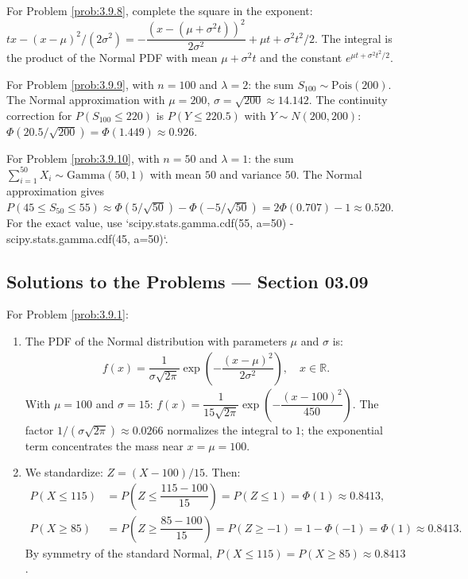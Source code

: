 \begin{sugerencia}
	\label{sug:3.9.8}
	For Problem \ref{prob:3.9.8}, complete the square in the exponent: $tx - (x-\mu)^{2}/(2\sigma^{2}) = -\dfrac{(x - (\mu + \sigma^{2}t))^{2}}{2\sigma^{2}} + \mu t + \sigma^{2}t^{2}/2$. The integral is the product of the Normal PDF with mean $\mu + \sigma^{2}t$ and the constant $e^{\mu t + \sigma^{2}t^{2}/2}$.
\end{sugerencia}

\begin{sugerencia}
	\label{sug:3.9.9}
	For Problem \ref{prob:3.9.9}, with $n = 100$ and $\lambda = 2$: the sum $S_{100} \sim \text{Pois}(200)$. The Normal approximation with $\mu = 200$, $\sigma = \sqrt{200} \approx 14.142$. The continuity correction for $P(S_{100} \le 220)$ is $P(Y \le 220.5)$ with $Y \sim N(200, 200)$: $\Phi(20.5/\sqrt{200}) = \Phi(1.449) \approx 0.926$.
\end{sugerencia}

\begin{sugerencia}
	\label{sug:3.9.10}
	For Problem \ref{prob:3.9.10}, with $n = 50$ and $\lambda = 1$: the sum $\sum_{i=1}^{50} X_{i} \sim \text{Gamma}(50, 1)$ with mean $50$ and variance $50$. The Normal approximation gives $P(45 \le S_{50} \le 55) \approx \Phi(5/\sqrt{50}) - \Phi(-5/\sqrt{50}) = 2\Phi(0.707) - 1 \approx 0.520$. For the exact value, use `scipy.stats.gamma.cdf(55, a=50) - scipy.stats.gamma.cdf(45, a=50)`.
\end{sugerencia}

\subsection*{Solutions to the Problems --- Section 03.09}

\begin{solucion}
	\label{sol:3.9.1}
	For Problem \ref{prob:3.9.1}:
	\begin{enumerate}
		\item The PDF of the Normal distribution with parameters $\mu$ and $\sigma$ is:
		\begin{align*}
			f(x) = \dfrac{1}{\sigma\sqrt{2\pi}} \exp\left(-\dfrac{(x - \mu)^{2}}{2\sigma^{2}}\right), \quad x \in \mathbb{R}.
		\end{align*}
		With $\mu = 100$ and $\sigma = 15$: $f(x) = \dfrac{1}{15\sqrt{2\pi}} \exp\left(-\dfrac{(x-100)^{2}}{450}\right)$. The factor $1/(\sigma\sqrt{2\pi}) \approx 0.0266$ normalizes the integral to $1$; the exponential term concentrates the mass near $x = \mu = 100$.
		\item We standardize: $Z = (X - 100)/15$. Then:
		\begin{align*}
			P(X \le 115) &= P\left(Z \le \dfrac{115 - 100}{15}\right) = P(Z \le 1) = \Phi(1) \approx 0.8413, \\
			P(X \ge 85) &= P\left(Z \ge \dfrac{85 - 100}{15}\right) = P(Z \ge -1) = 1 - \Phi(-1) = \Phi(1) \approx 0.8413.
		\end{align*}
		By symmetry of the standard Normal, $P(X \le 115) = P(X \ge 85) \approx 0.8413$.
	\end{enumerate}
\end{solucion}

